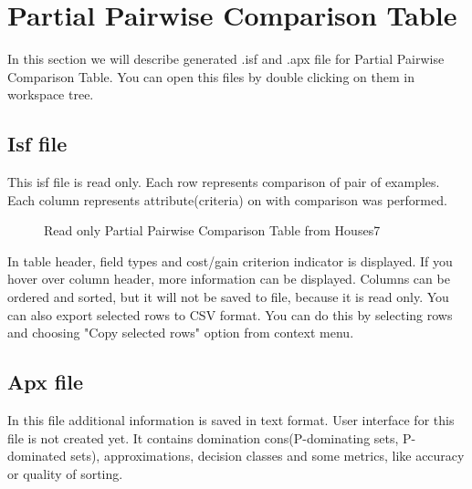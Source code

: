 \section{Partial Pairwise Comparison Table}\label{section:pct}

In this section we will describe generated .isf and .apx file for Partial Pairwise Comparison Table. You can open this files by double clicking on them in workspace tree.

\subsection{Isf file}\label{sub:pct-isf}

This isf file is read only. Each row represents comparison of pair of examples. Each column represents attribute(criteria) on with comparison was performed.

\begin{figure*}[!ht] 
	\centering
	\caption{Read only Partial Pairwise Comparison Table from Houses7}
\end{figure*}

In table header, field types and cost/gain criterion indicator is displayed. If you hover over column header, more information can be displayed. Columns can be ordered and sorted, but it will not be saved to file, because it is read only. You can also export selected rows to CSV format. You can do this by selecting rows and choosing "Copy selected rows" option from context menu.

\subsection{Apx file}\label{sub:pct-apx}

In this file additional information is saved in text format. User interface for this file is not created yet. It contains domination cons(P-dominating sets, P-dominated sets), approximations, decision classes and some metrics, like accuracy or quality of sorting.

\vfill\newpage